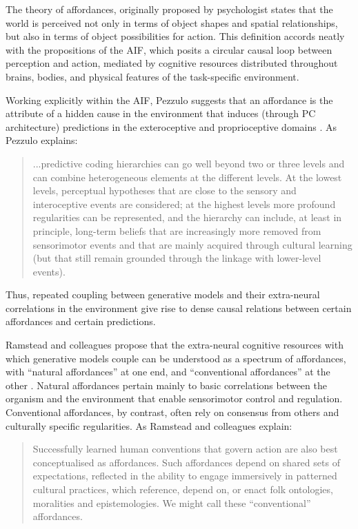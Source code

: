 \begin{CJK}{UTF8}{gbsn}
The theory of affordances, originally proposed by psychologist \textcite{Gibson1979} states that the world is perceived not only in terms of object shapes and spatial relationships, but also in terms of object possibilities for action. This definition accords neatly with the propositions of the AIF, which posits a circular causal loop between perception and action, mediated by cognitive resources distributed throughout brains, bodies, and physical features of the task-specific environment.

Working explicitly within the AIF, Pezzulo suggests that an affordance is the attribute of a hidden cause in the environment that induces (through PC architecture) predictions in the exteroceptive and proprioceptive domains \citep[908]{Pezzulo2013}. As Pezzulo explains:

   \begin{quote}
   ...predictive coding hierarchies can go well beyond two or three levels and can combine heterogeneous elements at the different levels.  At the lowest levels, perceptual hypotheses that are close to the sensory and interoceptive events are considered; at the highest levels more profound regularities can be represented, and the hierarchy can include, at least in principle, long-term beliefs that are increasingly more removed from sensorimotor events and that are mainly acquired through cultural learning (but that still remain grounded through the linkage with lower-level events).
   \end{quote}


Thus, repeated coupling between generative models and their extra-neural correlations in the environment give rise to dense causal relations between certain affordances and certain predictions.

Ramstead and colleagues propose that the extra-neural cognitive resources with which generative models couple can be understood as a spectrum of affordances,  with ``natural affordances'' at one end, and ``conventional affordances'' at the other \citep{Ramstead2016}.  Natural affordances pertain mainly to basic correlations between the organism and the environment that enable sensorimotor control and regulation.  Conventional affordances, by contrast, often rely on consensus from others and culturally specific regularities.  As Ramstead and colleagues explain:

\begin{quote}
  Successfully learned human conventions that govern action are also best conceptualised as affordances. Such affordances depend on shared sets of expectations, reflected in the ability to engage immersively in patterned cultural practices, which reference, depend on, or enact folk ontologies, moralities and epistemologies. We might call these ``conventional'' affordances.
\end{quote}


\end{CJK}
